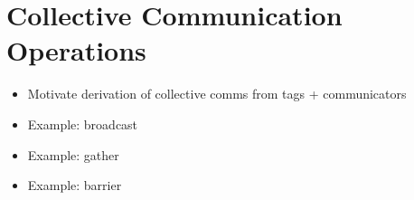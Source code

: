 \section{Collective Communication Operations}
\begin{itemize}
\item Motivate derivation of collective comms from tags + communicators
\item Example: broadcast
\item Example: gather
\item Example: barrier
\end{itemize}

